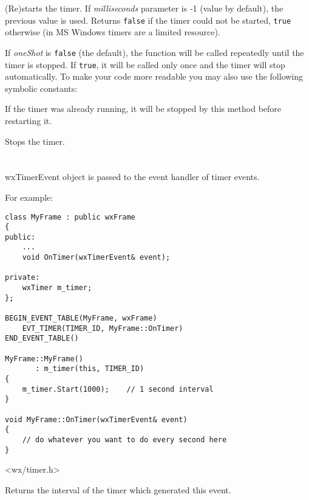 \label{wxtimerstart}


(Re)starts the timer. If {\it milliseconds}\/ parameter is -1 (value by default),
the previous value is used. Returns {\tt false} if the timer could not be started,
{\tt true} otherwise (in MS Windows timers are a limited resource).

If {\it oneShot}\/ is {\tt false} (the default), the  
function will be called repeatedly until the timer is stopped. If {\tt true},
it will be called only once and the timer will stop automatically. To make your
code more readable you may also use the following symbolic constants:

\twocolwidtha{5cm}
\begin{twocollist}\itemsep=0pt
\end{twocollist}

If the timer was already running, it will be stopped by this method before
restarting it.

\label{wxtimerstop}


Stops the timer.

\section{}\label{wxtimerevent}

wxTimerEvent object is passed to the event handler of timer events.

For example:

\begin{verbatim}
class MyFrame : public wxFrame
{
public:
    ...
    void OnTimer(wxTimerEvent& event);

private:
    wxTimer m_timer;
};

BEGIN_EVENT_TABLE(MyFrame, wxFrame)
    EVT_TIMER(TIMER_ID, MyFrame::OnTimer)
END_EVENT_TABLE()

MyFrame::MyFrame()
       : m_timer(this, TIMER_ID)
{
    m_timer.Start(1000);    // 1 second interval
}

void MyFrame::OnTimer(wxTimerEvent& event)
{
    // do whatever you want to do every second here
}

\end{verbatim}


<wx/timer.h>




\label{wxtimereventgetinterval}


Returns the interval of the timer which generated this event.

